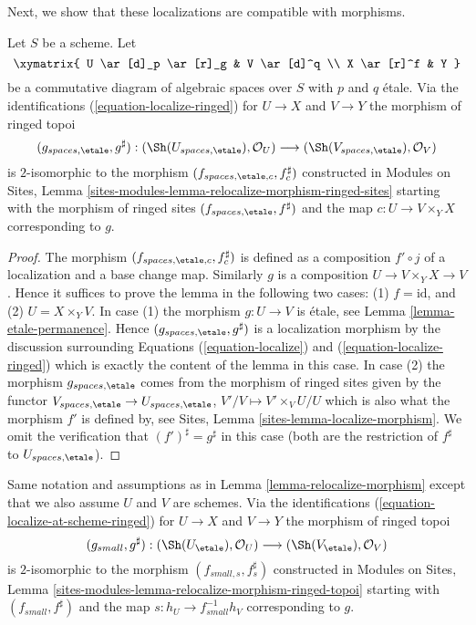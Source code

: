 \medskip\noindent
Next, we show that these localizations are compatible with morphisms.

\begin{lemma}
\label{lemma-relocalize-morphism}
Let $S$ be a scheme. Let
$$
\xymatrix{
U \ar[d]_p \ar[r]_g & V \ar[d]^q \\
X \ar[r]^f & Y
}
$$
be a commutative diagram of algebraic spaces over $S$ with $p$ and $q$ \'etale.
Via the identifications
(\ref{equation-localize-ringed}) for $U \to X$ and $V \to Y$
the morphism of ringed topoi
$$
(g_{spaces, \etale}, g^\sharp) :
(\Sh(U_{spaces, \etale}), \mathcal{O}_U)
\longrightarrow
(\Sh(V_{spaces, \etale}), \mathcal{O}_V)
$$
is $2$-isomorphic to the morphism $(f_{spaces, \etale, c}, f_c^\sharp)$
constructed in
Modules on Sites,
Lemma \ref{sites-modules-lemma-relocalize-morphism-ringed-sites}
starting with the morphism of ringed sites
$(f_{spaces, \etale}, f^\sharp)$ and
the map $c : U \to V \times_Y X$ corresponding to $g$.
\end{lemma}

\begin{proof}
The morphism $(f_{spaces, \etale, c}, f_c^\sharp)$ is defined as a
composition $f' \circ j$
of a localization and a base change map. Similarly $g$ is a composition
$U \to V \times_Y X \to V$. Hence it suffices to prove
the lemma in the following two cases: (1) $f = \text{id}$, and
(2) $U = X \times_Y V$. In case (1) the morphism $g : U \to V$ is
\'etale, see
Lemma \ref{lemma-etale-permanence}.
Hence $(g_{spaces, \etale}, g^\sharp)$ is a localization morphism
by the discussion surrounding
Equations (\ref{equation-localize}) and
(\ref{equation-localize-ringed})
which is exactly the content of the lemma in this case.
In case (2) the morphism $g_{spaces, \etale}$
comes from the morphism of ringed sites given by the functor
$V_{spaces, \etale} \to U_{spaces, \etale}$,
$V'/V \mapsto V' \times_V U/U$
which is also what the morphism $f'$ is defined by, see
Sites, Lemma \ref{sites-lemma-localize-morphism}.
We omit the verification that $(f')^\sharp = g^\sharp$
in this case (both are the restriction of $f^\sharp$
to $U_{spaces, \etale}$).
\end{proof}

\begin{lemma}
\label{lemma-relocalize-morphism-at-schemes}
Same notation and assumptions as in
Lemma \ref{lemma-relocalize-morphism}
except that we also assume $U$ and $V$ are schemes.
Via the identifications
(\ref{equation-localize-at-scheme-ringed})
for $U \to X$ and $V \to Y$ the morphism of ringed topoi
$$
(g_{small}, g^\sharp) :
(\Sh(U_\etale), \mathcal{O}_U)
\longrightarrow
(\Sh(V_\etale), \mathcal{O}_V)
$$
is $2$-isomorphic to the morphism $(f_{small, s}, f_s^\sharp)$
constructed in
Modules on Sites,
Lemma \ref{sites-modules-lemma-relocalize-morphism-ringed-topoi}
starting with $(f_{small}, f^\sharp)$ and
the map $s : h_U \to f_{small}^{-1}h_V$ corresponding to $g$.
\end{lemma}

